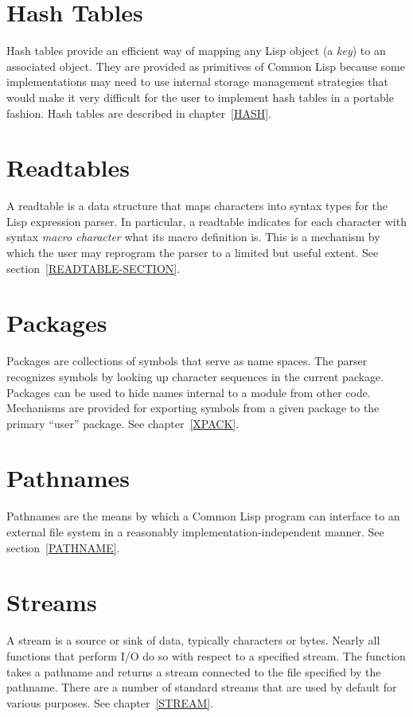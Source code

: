 \section{Hash Tables}

Hash tables provide an efficient way of mapping any
Lisp object (a {\it key}) to an associated object.
They are provided as primitives of Common Lisp because
some implementations may need to use internal storage
management strategies that would make it very difficult
for the user to implement hash tables in a portable fashion.
Hash tables are described in chapter~\ref{HASH}.

\section{Readtables}

A readtable is a data structure that maps characters into syntax
types for the Lisp expression parser.
In particular, a readtable indicates for
each character with syntax {\it macro character} what its macro
definition is.  This is a mechanism by which the user may reprogram
the parser to a limited but useful extent.
See section~\ref{READTABLE-SECTION}.

\section{Packages}

Packages are collections of symbols that serve as name spaces.
The parser recognizes symbols by looking up character sequences
in the current package.  Packages can be used to hide
names internal to a module from other code.  Mechanisms are provided
for exporting symbols from a given package to the primary ``user'' package.
See chapter~\ref{XPACK}.

\section{Pathnames}
Pathnames are the means by which a Common Lisp program can
interface to an external file system in a reasonably implementation-independent
manner.  See section~\ref{PATHNAME}.

\section{Streams}

A stream is a source or sink of data, typically characters or bytes.
Nearly all functions that perform I/O do so with respect to a specified
stream.  The function  takes a pathname and returns a stream
connected to the file specified by the pathname.
There are a number of standard streams that are used by default for
various purposes.  See chapter~\ref{STREAM}.

